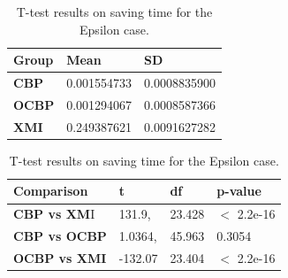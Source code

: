 \documentclass{llncs}
\begin{document}
    \begin{table}[ht]
        \centering
        \label{table:ttest_save_time_epsilon}
        \caption{T-test results on saving time for the Epsilon case.}
        \begin{minipage}{0.44\textwidth}
            \centering
            \begin{tabular}{|p{}|p{}|p{}|}
                \hline 
                \textbf{Group}  & \textbf{Mean} & \textbf{SD} \\ 
                \hline 
                \textbf{CBP} &0.001554733    &  0.0008835900 \\ 
                \hline 
                \textbf{OCBP} &  0.001294067  &  0.0008587366 \\ 
                \hline 
                \textbf{XMI} & 0.249387621   &0.0091627282 \\ 
                \hline 
            \end{tabular} 
        \end{minipage}
        \hfill
        \begin{minipage}{0.54\textwidth}
            \centering
            \begin{tabular}{|p{}|p{}|p{}|p{}|}
                \hline 
                \textbf{Comparison} & \textbf{t}  & \textbf{df} & \textbf{p-value} \\ 
                \hline 
                \textbf{CBP vs XM}I & 131.9,    & 23.428 & $<$ 2.2e-16 \\ 
                \hline 
                \textbf{CBP vs OCBP} &1.0364, & 45.963 & 0.3054 \\ 
                \hline 
                \textbf{OCBP vs XMI} & -132.07    &23.404  & $<$ 2.2e-16 \\ 
                \hline 
            \end{tabular} 
        \end{minipage}
    \end{table}
    
\end{document}
